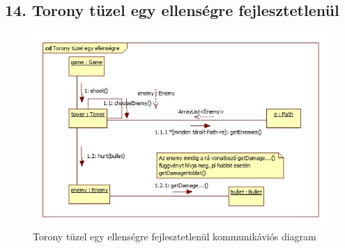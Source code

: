 \subsection{14. Torony tüzel egy ellenségre fejlesztetlenül}
\begin{figure}[H]
\begin{center}
\includegraphics[width=17cm]{chapters/chapter05/images/cd_Torony_tuzel_egy_ellensegre_fejlesztetlenul.jpg}
\caption{Torony tüzel egy ellenségre fejlesztetlenül kommunikáviós diagram}
\label{fig:cd_Torony_tuzel_egy_ellensegre_fejlesztetlenul}
\end{center}
\end{figure}








